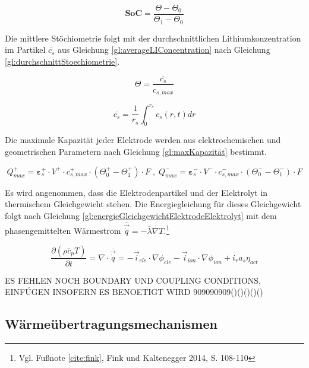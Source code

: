 \begin{equation}
	\mathbf{SoC} = \frac{\Theta - \Theta_{0}}{\Theta_{1} - \Theta_{0}} \label{gl:SOCDef}
\end{equation}

Die mittlere Stöchiometrie folgt mit der durchschnittlichen Lithiumkonzentration im Partikel $\overline{c_{s}}$ aus Gleichung \ref{gl:averageLIConcentration} nach Gleichung \ref{gl:durchschnittStoechiometrie}.

\begin{equation}
	\Theta = \frac{\overline{c_{s}}}{c_{s,max}} \label{gl:durchschnittStoechiometrie}
\end{equation}

\begin{equation}
	\overline{c_{s}} = \frac{1}{r_{s}} \int_{0}^{r_{s}} c_{s}(r,t) dr \label{gl:averageLIConcentration}
\end{equation}

Die maximale Kapazität jeder Elektrode werden aus elektrochemischen und geometrischen Parametern nach Gleichung \ref{gl:maxKapazität} bestimmt.

\begin{equation}
	Q^{+}_{max} = \mathbf{\varepsilon}^{+}_{s}\cdot V^{+} \cdot c_{s,max}^{+} \cdot (\Theta^{+}_{0} - \Theta^{+}_{1}) \cdot F \; , \; Q^{-}_{max} =  \mathbf{\varepsilon}^{-}_{s}\cdot V^{-}\cdot c^{-}_{s,max}\cdot (\Theta^{-}_{0} - \Theta^{-}_{1}) \cdot F \label{gl:maxKapazität}
\end{equation}

Es wird angenommen, dass die Elektrodenpartikel und der Elektrolyt in thermischem Gleichgewicht stehen. Die Energiegleichung für dieses Gleichgewicht folgt nach Gleichung \ref{gl:energieGleichgewichtElektrodeElektrolyt} mit dem phasengemittelten Wärmestrom $\overline{\vec{\dot{q}}} = -\overline{\lambda} \nabla T$.\footnote{Vgl. Fußnote \ref{cite:fink}, Fink und Kaltenegger 2014, S. 108-110}

\begin{equation}
	\frac{\partial (\overline{\rho c_{p}} T)}{\partial t} = \nabla \cdot \overline{\vec{\dot{q}}} = - \vec{i}_{ele} \cdot \nabla \phi_{ele} - \vec{i}_{ion} \cdot \nabla \phi_{ion} + i_{r} a_{s} \eta_{act} \label{gl:energieGleichgewichtElektrodeElektrolyt}
\end{equation}


ES FEHLEN NOCH BOUNDARY UND COUPLING CONDITIONS, EINFÚGEN INSOFERN ES BENOETIGT WIRD 909090909()()()()()

\newpage
\subsection{Wärmeübertragungsmechanismen}\label{sub:waermeuebertragung}

